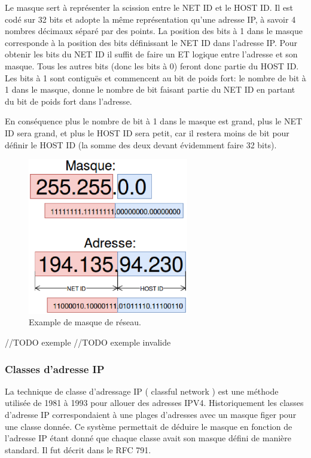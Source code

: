 Le masque sert à représenter la scission entre le NET ID et le HOST ID.
Il est codé sur 32 bits et adopte la même représentation qu'une adresse IP, à savoir
4 nombres décimaux séparé par des points.
La position des bits à 1 dans le masque corresponde à la position des bits définissant le NET ID dans l'adresse IP.
Pour obtenir les bits du NET ID il suffit de faire un ET logique entre l'adresse et son masque. Tous les autres bits (donc les bits à 0)
feront donc partie du HOST ID.
Les bits à 1 sont contiguës et commencent au bit de poids fort: le nombre de bit à 1 dans le masque, donne
le nombre de bit faisant partie du NET ID en partant du bit de poids fort dans l'adresse.

En conséquence plus le nombre de bit à 1 dans le masque est grand, plus le NET ID sera grand, et plus le HOST ID sera petit, car il restera moins de bit pour définir le HOST ID (la somme des deux devant évidemment faire 32 bits).

\begin{figure}[h]
\centering
\includegraphics[width=7cm]{./pics/maskipv4.eps}
\caption{Example de masque de réseau.}
\label{fig:exmask}
\end{figure}

//TODO exemple
//TODO exemple invalide

\subsubsection{Classes d'adresse IP}
La technique de classe d'adressage IP ( classful network ) est une méthode
utilisée de 1981 à 1993 pour allouer des adresses IPV4.
Historiquement les classes d'adresse IP correspondaient à une plages d'adresses avec un masque figer pour une classe donnée.
Ce système permettait de déduire le masque en fonction
de l'adresse IP étant donné que chaque classe avait son masque défini de manière standard.
Il fut décrit dans le RFC 791\cite{url-RFC-791}.

